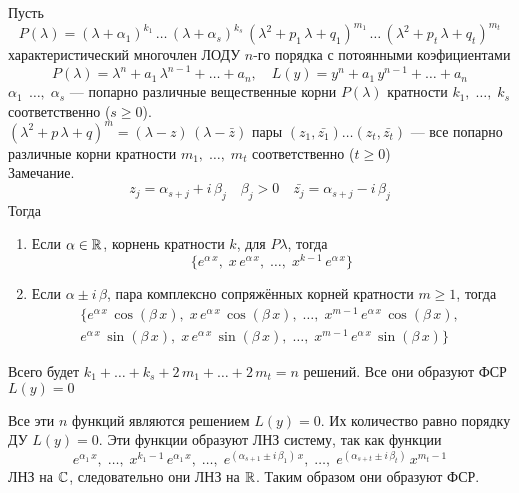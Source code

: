 \begin{Th}
    Пусть 
    \[
        P(\lambda) = (\lambda + \alpha_1)^{k_1}\,\dots\,(\lambda + \alpha_s)^{k_s}\,(\lambda^2 + p_1\,\lambda + q_1)^{m_1}\,\dots\,(\lambda^2 + p_t\,\lambda + q_t)^{m_t}
    \]
    характеристический многочлен ЛОДУ $n$-го порядка с потоянными коэфициентами
    \[
        P(\lambda) = \lambda^n + a_1\,\lambda^{n-1} + \dots + a_n, \quad L(y) = y^n + a_1\,y^{n-1} + \dots + a_n
    \]
    $\alpha_1\,\; \dots,\; \alpha_s$ --- попарно различные вещественные корни $P(\lambda)$ кратности $k_1,\; \dots,\; k_s$ соответственно ($s \geqslant 0$).\\
    $(\lambda^2 + p\,\lambda + q)^m = (\lambda - z)\,(\lambda - \bar{z})$ пары $(z_1, \bar{z_1})\dots(z_t, \bar{z_t})$ --- все попарно различные корни кратности $m_1,\; \dots,\; m_t$ соответственно ($t \geqslant 0$)\\
    
    Замечание.
    \[
        z_j = \alpha_{s + j} + i\,\beta_{j} \quad \beta_{j} > 0 \quad \bar{z_j} = \alpha_{s + j} - i\,\beta_{j}
    \]
    Тогда
    \begin{enumerate}
        \item Если $\alpha \in \mathbb{R}$, корнень кратности $k$, для $P{\lambda}$, тогда
        \[
        \{e^{\alpha\,x},\; x\,e^{\alpha\,x},\; \dots,\; x^{k-1}\,e^{\alpha\,x}\}
        \]
        
        \item Если $\alpha \pm i\,\beta$, пара комплексно сопряжённых корней кратности $m \geqslant 1$, тогда
        \begin{gather*}
        \{e^{\alpha\, x}\,\cos(\beta\,x),\; x\,e^{\alpha\, x}\,\cos(\beta\,x),\; \dots,\; x^{m-1}\,e^{\alpha\, x}\,\cos(\beta\,x),\;\\
        e^{\alpha\, x}\,\sin(\beta\,x),\; x\,e^{\alpha\, x}\,\sin(\beta\,x),\; \dots,\; x^{m-1}\,e^{\alpha\, x}\,\sin(\beta\,x)\}
        \end{gather*}
    \end{enumerate} 
    Всего будет $k_1 + \dots + k_s + 2\,m_1 + \dots + 2\,m_t = n$ решений. Все они образуют ФСР $L(y) = 0$    
\end{Th}

\begin{Proof}
    Все эти $n$ функций являются решением $L(y) = 0$. Их количество равно порядку ДУ $L(y) = 0$. Эти функции образуют ЛНЗ систему, так как функции
    \[
        e^{\alpha_1\,x},\; \dots,\; x^{k_1 - 1}\,e^{\alpha_1\,x},\; \dots,\; e^{(\alpha_{s+1} \pm i\,\beta_1)\,x},\; \dots,\; e^{(\alpha_{s+t} \pm i\,\beta_t)}\,x^{m_t-1}
    \]
    ЛНЗ на $\mathbb{C}$, следовательно они ЛНЗ на $\mathbb{R}$. Таким образом они образуют ФСР.
\end{Proof}

